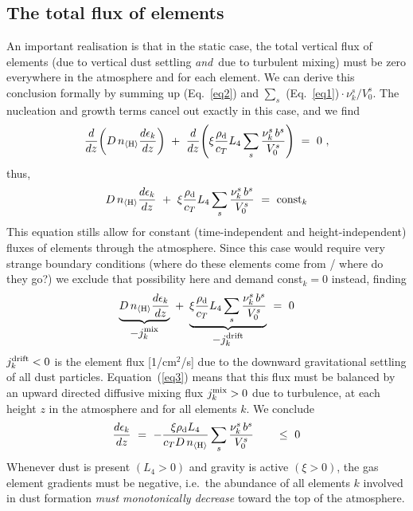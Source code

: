 \documentclass[11pt]{article}
\def\nH{n_{\langle\rm H\rangle}}
\def\rhod{\rho_{\rm d}}
\def\ek{\epsilon_k}
\begin{document}
\subsection{The total flux of elements}

An important realisation is that in the static case, the total
vertical flux of elements (due to vertical dust settling {\it and\,} due to
turbulent mixing) must be zero everywhere in the atmosphere and for
each element. We can derive this conclusion formally by summing up
(Eq.~\ref{eq2}) and $\sum_s$
(Eq.~\ref{eq1})\,$\cdot\,\nu_k^s/V_0^s$. The nucleation and growth
terms cancel out exactly in this case, and we find
\begin{equation}
  \frac{d}{dz}\!\left(D\,\nH\frac{d\ek}{dz}\right) 
  ~+~ \frac{d}{dz}\!\left(\xi
      \frac{\rhod}{c_T}L_4\sum\limits_s\frac{\nu_k^s\,b^s}{V_0^s}\right)
  ~=~0  \ ,
\end{equation}
thus,
\begin{equation}
  D\,\nH\frac{d\ek}{dz} 
  ~+~ \xi\frac{\rhod}{c_T}L_4\sum\limits_s\frac{\nu_k^s\,b^s}{V_0^s}
  ~=~ \mbox{const}_k
\end{equation}
This equation stills allow for constant (time-independent and
height-independent) fluxes of elements through the atmosphere. Since
this case would require very strange boundary conditions (where do
these elements come from / where do they go?) we exclude that
possibility here and demand const$_k=0$ instead, finding
\begin{equation}
  \underbrace{D\,\nH\frac{d\ek}{dz}}_{\displaystyle-j_k^{\rm mix}} ~+~
  \underbrace{\xi\frac{\rhod}{c_T}L_4\sum\limits_s\frac{\nu_k^s\,b^s}{V_0^s}
             }_{\displaystyle-j_k^{\rm drift}}
  ~=~ 0
  \label{eq3}
\end{equation}
$j_k^{\rm drift}<0$ is the element flux [1/cm$^2$/s] due to the
downward gravitational settling of all dust particles.
Equation~(\ref{eq3}) means that this flux must be balanced by an
upward directed diffusive mixing flux $j_k^{\rm mix}>0$ due to turbulence, at
each height $z$ in the atmosphere and for all elements $k$. We conclude
\begin{equation}
  \frac{d\ek}{dz} ~=~
  -\frac{\xi\rhod L_4}{c_T D\,\nH} \sum\limits_s\frac{\nu_k^s\,b^s}{V_0^s}
  \quad\quad\leq~0
  \label{eq4}
\end{equation}
Whenever dust is present $(L_4>0)$ and gravity is active $(\xi>0)$,
the gas element gradients must be negative, i.e.\ the abundance of all
elements $k$ involved in dust formation {\sl must monotonically
  decrease} toward the top of the atmosphere.
\end{document}
